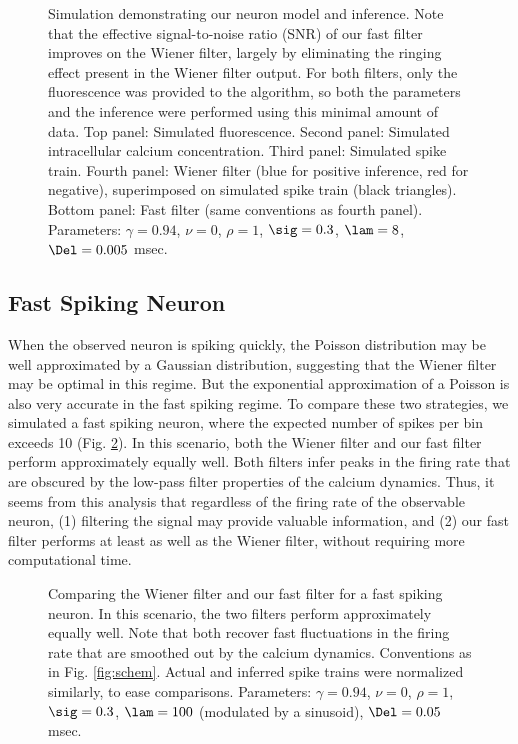\begin{figure}
\caption{Simulation demonstrating our neuron model and inference. Note that the effective signal-to-noise ratio (SNR) of our fast filter improves on the Wiener filter, largely by eliminating the ringing effect present in the Wiener filter output.  For both filters, only the fluorescence was provided to the algorithm, so both the parameters and the inference were performed using this minimal amount of data.  Top panel: Simulated fluorescence. Second panel: Simulated intracellular calcium concentration. Third panel: Simulated spike train.  Fourth panel: Wiener filter (blue for positive inference, red for negative), superimposed on simulated spike train (black triangles).  Bottom panel: Fast filter (same conventions as fourth panel). Parameters:  $\gamma=0.94$, $\nu=0$, $\rho=1$, $\sig=0.3$, $\lam=8$, $\Del=0.005$ msec.} \label{fig:schem2}
\end{figure}

\subsection{Fast Spiking Neuron}

When the observed neuron is spiking quickly, the Poisson distribution may be well approximated by a Gaussian distribution, suggesting that the Wiener filter may be optimal in this regime.  But the exponential approximation of a Poisson is also very accurate in the fast spiking regime.  To compare these two strategies, we simulated a fast spiking neuron, where the expected number of spikes per bin exceeds 10 (Fig. \ref{fig:FastSpiking}). In this scenario, both the Wiener filter and our fast filter perform approximately equally well.  Both filters infer peaks in the firing rate that are obscured by the low-pass filter properties of the calcium dynamics. Thus, it seems from this analysis that regardless of the firing rate of the observable neuron, (1) filtering the signal may provide valuable information, and (2) our fast filter performs at least as well as the Wiener filter, without requiring more computational time.

\begin{figure}
\caption{Comparing the Wiener filter and our fast filter for a fast spiking neuron.  In this scenario, the two filters perform approximately equally well. Note that both recover fast fluctuations in the firing rate that are smoothed out by the calcium dynamics. Conventions as in Fig. \ref{fig:schem}.  Actual and inferred spike trains were normalized similarly, to ease comparisons. Parameters: $\gamma=0.94$, $\nu=0$, $\rho=1$, $\sig=0.3$, $\lam=100$ (modulated by a sinusoid), $\Del=0.05$ msec.} \label{fig:FastSpiking}
\end{figure}


